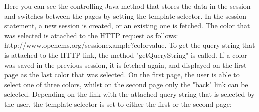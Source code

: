 Here you can see the controlling Java method that stores the data in the
session and switches between the pages by setting the template selector.
In the session statement, a new session is created, or an existing one is
fetched. The color that was selected is attached to the HTTP request as
follows: http://www.opencms.org/sessionexample?colorvalue. To get the
query string that is attached to the HTTP link, the method
{\meth "getQueryString"} is called. If a color was saved in the previous session,
it is fetched again, and displayed on the first page as the last color
that was selected. On the first page, the user is able to select one of
three colors, whilst on the second page only the "back" link can be
selected. Depending on the link with the attached query string that is
selected by the user, the template selector is set to either the first
or the second page:

